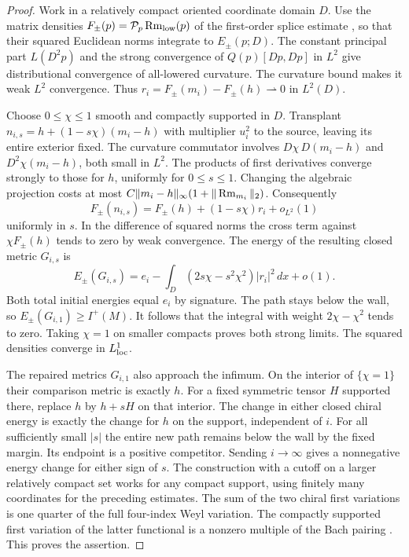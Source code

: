 \begin{proof}
Work in a relatively compact oriented coordinate domain \(D\).
Use the matrix densities \(F_\pm(p)=\mathcal P_p\operatorname{Rm}_{\rm low}(p)\)
of the first-order splice estimate \cite[First-order splice]{Baker2026CollarDeformation}, so that their squared Euclidean norms
integrate to \(E_\pm(p;D)\). The constant principal part
\(L(D^2p)\) and the strong convergence of \(Q(p)[Dp,Dp]\) in
\(L^2\) give distributional convergence of all-lowered curvature.
The curvature bound makes it weak \(L^2\) convergence. Thus
\(r_i=F_\pm(m_i)-F_\pm(h)\rightharpoonup0\) in \(L^2(D)\).

Choose \(0\le\chi\le1\) smooth and compactly supported in \(D\).
Transplant \(n_{i,s}=h+(1-s\chi)(m_i-h)\) with multiplier \(u_i^2\)
to the source, leaving its entire exterior fixed. The curvature
commutator involves \(D\chi\,D(m_i-h)\) and \(D^2\chi(m_i-h)\),
both small in \(L^2\). The products of first derivatives converge
strongly to those for \(h\), uniformly for \(0\le s\le1\).
Changing the algebraic projection costs at most
\(C\|m_i-h\|_\infty(1+\|\operatorname{Rm}_{m_i}\|_2)\). Consequently
\[
 F_\pm(n_{i,s})=F_\pm(h)+(1-s\chi)r_i+o_{L^2}(1)
\]
uniformly in \(s\). In the difference of squared norms the cross
term against \(\chi F_\pm(h)\) tends to zero by weak convergence.
The energy of the resulting closed metric \(G_{i,s}\) is
\[
 E_\pm(G_{i,s})=e_i-
 \int_D (2s\chi-s^2\chi^2)|r_i|^2\,dx+o(1).
\]
Both total initial energies equal \(e_i\) by signature. The path
stays below the wall, so \(E_\pm(G_{i,1})\ge I^+(M)\). It follows
that the integral with weight \(2\chi-\chi^2\) tends to zero.
Taking \(\chi=1\) on smaller compacts proves both strong limits.
The squared densities converge in \(L^1_{\rm loc}\).

The repaired metrics \(G_{i,1}\) also approach the infimum. On the
interior of \(\{\chi=1\}\) their comparison metric is exactly \(h\).
For a fixed symmetric tensor \(H\) supported there, replace \(h\)
by \(h+sH\) on that interior. The change in either closed chiral
energy is exactly the change for \(h\) on the support, independent
of \(i\). For all sufficiently small \(|s|\) the entire new path
remains below the wall by the fixed margin. Its endpoint is a
positive competitor. Sending \(i\to\infty\) gives a nonnegative
energy change for either sign of \(s\). The construction with a
cutoff on a larger relatively compact set works for any compact
support, using finitely many coordinates for the preceding estimates.
The sum of the two chiral first variations is one quarter of the full four-index Weyl variation. The compactly supported first variation of the latter functional is
a nonzero multiple of the Bach pairing
\cite[\S2.1]{TianViaclovsky2004Moduli}. This proves the assertion.
\end{proof}

